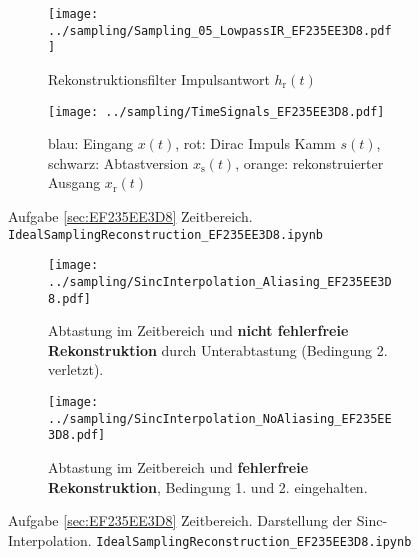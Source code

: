 \begin{figure*}[h!]
\centering
\begin{subfigure}{0.75\textwidth}
\texttt{[image: ../sampling/Sampling\_05\_LowpassIR\_EF235EE3D8.pdf]}
\caption{Rekonstruktionsfilter Impulsantwort $h_\mathrm{r}(t)$}
\label{fig:Sampling_05_LowpassIR_EF235EE3D8}
\end{subfigure}

\begin{subfigure}{0.75\textwidth}
\texttt{[image: ../sampling/TimeSignals\_EF235EE3D8.pdf]}
\caption{blau: Eingang $x(t)$, rot: Dirac Impuls Kamm $s(t)$,
schwarz: Abtastversion $x_\mathrm{s}(t)$, orange: rekonstruierter Ausgang $x_\mathrm{r}(t)$}
\label{fig:TimeSignals_EF235EE3D8}
\end{subfigure}
\caption{Aufgabe \ref{sec:EF235EE3D8} Zeitbereich. \texttt{IdealSamplingReconstruction\_EF235EE3D8.ipynb}}
\label{fig:EF235EE3D8_TimeDomain}
\end{figure*}





\begin{figure*}[h!]
\centering
\begin{subfigure}{0.75\textwidth}
\texttt{[image: ../sampling/SincInterpolation\_Aliasing\_EF235EE3D8.pdf]}
\caption{Abtastung im Zeitbereich und \textbf{nicht fehlerfreie Rekonstruktion}
durch Unterabtastung (Bedingung 2. verletzt).}
\label{fig:SincInterpolation_Aliasing_EF235EE3D8}
\end{subfigure}

\begin{subfigure}{0.75\textwidth}
\texttt{[image: ../sampling/SincInterpolation\_NoAliasing\_EF235EE3D8.pdf]}
\caption{Abtastung im Zeitbereich und \textbf{fehlerfreie Rekonstruktion},
Bedingung 1. und 2. eingehalten.}
\label{fig:SincInterpolation_NoAliasing_EF235EE3D8}
\end{subfigure}
\caption{Aufgabe \ref{sec:EF235EE3D8} Zeitbereich.
Darstellung der Sinc-Interpolation. \texttt{IdealSamplingReconstruction\_EF235EE3D8.ipynb}}
\label{fig:SincInterpolation_EF235EE3D8}
\end{figure*}






\clearpage

